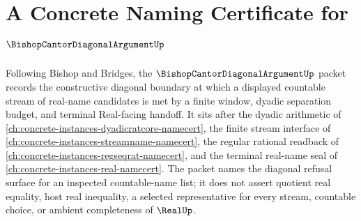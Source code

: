 \chapter{A Concrete Naming Certificate for $\BishopCantorDiagonalArgumentUp$}
\label{ch:concrete-instances-bishop-cantor-diagonal-argument-namecert}

Following Bishop and Bridges, the $\BishopCantorDiagonalArgumentUp$ packet records the constructive diagonal boundary at which a displayed countable stream of real-name candidates is met by a finite window, dyadic separation budget, and terminal Real-facing handoff. It sits after the dyadic arithmetic of \autoref{ch:concrete-instances-dyadicratcore-namecert}, the finite stream interface of \autoref{ch:concrete-instances-streamname-namecert}, the regular rational readback of \autoref{ch:concrete-instances-regseqrat-namecert}, and the terminal real-name seal of \autoref{ch:concrete-instances-real-namecert}. The packet names the diagonal refusal surface for an inspected countable-name list; it does not assert quotient real equality, host real inequality, a selected representative for every stream, countable choice, or ambient completeness of $\RealUp$.


